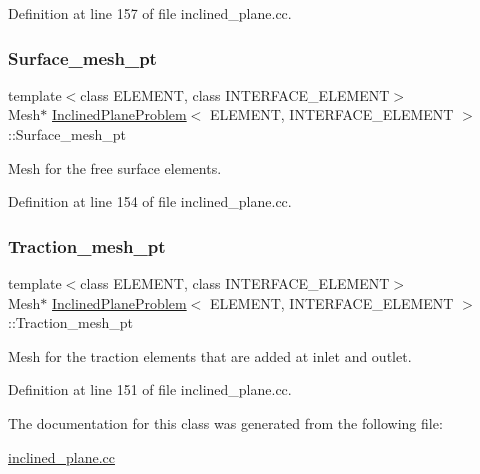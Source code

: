 Definition at line 157 of file inclined\+\_\+plane.\+cc.

\mbox{\label{classInclinedPlaneProblem_aba36d367278218bf00356c3bee0733a0}} 
\subsubsection{\texorpdfstring{Surface\+\_\+mesh\+\_\+pt}{Surface\_mesh\_pt}}
{\footnotesize\ttfamily template$<$class E\+L\+E\+M\+E\+NT, class I\+N\+T\+E\+R\+F\+A\+C\+E\+\_\+\+E\+L\+E\+M\+E\+NT$>$ \\
Mesh$\ast$ \hyperlink{classInclinedPlaneProblem}{Inclined\+Plane\+Problem}$<$ E\+L\+E\+M\+E\+NT, I\+N\+T\+E\+R\+F\+A\+C\+E\+\_\+\+E\+L\+E\+M\+E\+NT $>$\+::Surface\+\_\+mesh\+\_\+pt\hspace{0.3cm}{\ttfamily [protected]}}



Mesh for the free surface elements. 



Definition at line 154 of file inclined\+\_\+plane.\+cc.

\mbox{\label{classInclinedPlaneProblem_a85bcc36a8ad4ad7aa3595585e73a3197}} 
\subsubsection{\texorpdfstring{Traction\+\_\+mesh\+\_\+pt}{Traction\_mesh\_pt}}
{\footnotesize\ttfamily template$<$class E\+L\+E\+M\+E\+NT, class I\+N\+T\+E\+R\+F\+A\+C\+E\+\_\+\+E\+L\+E\+M\+E\+NT$>$ \\
Mesh$\ast$ \hyperlink{classInclinedPlaneProblem}{Inclined\+Plane\+Problem}$<$ E\+L\+E\+M\+E\+NT, I\+N\+T\+E\+R\+F\+A\+C\+E\+\_\+\+E\+L\+E\+M\+E\+NT $>$\+::Traction\+\_\+mesh\+\_\+pt\hspace{0.3cm}{\ttfamily [protected]}}



Mesh for the traction elements that are added at inlet and outlet. 



Definition at line 151 of file inclined\+\_\+plane.\+cc.



The documentation for this class was generated from the following file\+:\begin{DoxyCompactItemize}
\item 
\hyperlink{inclined__plane_8cc}{inclined\+\_\+plane.\+cc}\end{DoxyCompactItemize}
